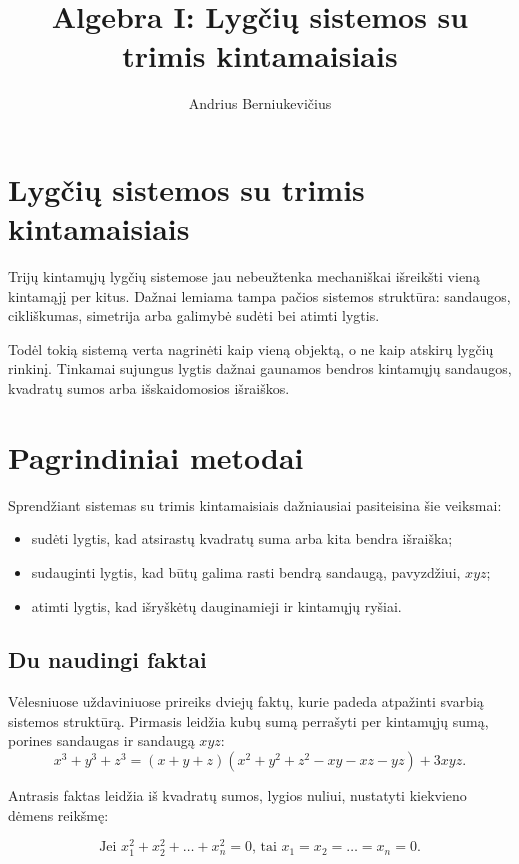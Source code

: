 \documentclass[11pt,a4paper]{scrartcl}
\title{Algebra I: Lygčių sistemos su trimis kintamaisiais}
\author{Andrius Berniukevičius}
\begin{document}
\maketitle

\section{Lygčių sistemos su trimis kintamaisiais}

Trijų kintamųjų lygčių sistemose jau nebeužtenka mechaniškai išreikšti vieną kintamąjį per kitus. Dažnai lemiama tampa pačios sistemos struktūra: sandaugos, cikliškumas, simetrija arba galimybė sudėti bei atimti lygtis.

Todėl tokią sistemą verta nagrinėti kaip vieną objektą, o ne kaip atskirų lygčių rinkinį. Tinkamai sujungus lygtis dažnai gaunamos bendros kintamųjų sandaugos, kvadratų sumos arba išskaidomosios išraiškos.

\section{Pagrindiniai metodai}

Sprendžiant sistemas su trimis kintamaisiais dažniausiai pasiteisina šie veiksmai:
\begin{itemize}
    \item sudėti lygtis, kad atsirastų kvadratų suma arba kita bendra išraiška;
    \item sudauginti lygtis, kad būtų galima rasti bendrą sandaugą, pavyzdžiui, $xyz$;
    \item atimti lygtis, kad išryškėtų dauginamieji ir kintamųjų ryšiai.
\end{itemize}

\subsection{Du naudingi faktai}
Vėlesniuose uždaviniuose prireiks dviejų faktų, kurie padeda atpažinti svarbią sistemos struktūrą. Pirmasis leidžia kubų sumą perrašyti per kintamųjų sumą, porines sandaugas ir sandaugą $xyz$:
$$
x^3+y^3+z^3=(x+y+z)(x^2+y^2+z^2-xy-xz-yz)+3xyz.
$$

Antrasis faktas leidžia iš kvadratų sumos, lygios nuliui, nustatyti kiekvieno dėmens reikšmę:

\begin{equation*}
\text{Jei }x_1^2+x_2^2+\dots+x_n^2=0 \text{, tai }x_1=x_2=\dots=x_n=0.
\end{equation*}
\end{document}
